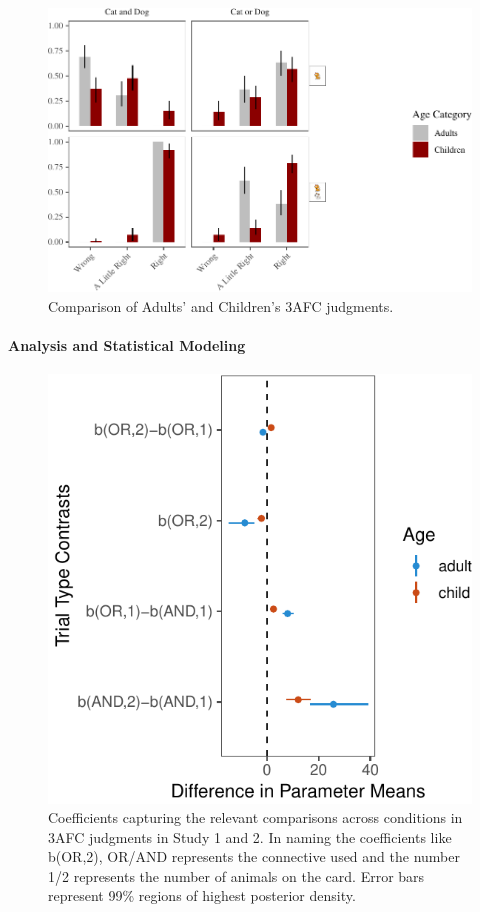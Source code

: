 \documentclass[floatsintext,man]{apa6}
\theoremstyle{definition}
\theoremstyle{definition}
\theoremstyle{definition}
\theoremstyle{remark}
\begin{document}
\begin{figure}
\centering
\includegraphics{figs/childAdultComp-1.pdf}
\caption{\label{fig:childAdultComp}Comparison of Adults' and Children's 3AFC
judgments.}
\end{figure}

\paragraph{Analysis and Statistical
Modeling}\label{analysis-and-statistical-modeling}

\begin{figure}
\centering
\includegraphics{figs/stanModelPlot-1.pdf}
\caption{\label{fig:stanModelPlot}Coefficients capturing the relevant
comparisons across conditions in 3AFC judgments in Study 1 and 2. In
naming the coefficients like b(OR,2), OR/AND represents the connective
used and the number 1/2 represents the number of animals on the card.
Error bars represent 99\% regions of highest posterior density.}
\end{figure}
\end{document}
